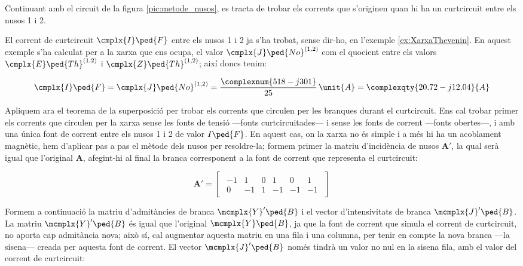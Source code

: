 \begin{exemple}\label{ex:CurtcircuitXarxaComplexa}
	\addcontentsxms{\CurtcircuitXarxaComplexa}	
	Continuant amb el circuit de la figura \vref{pic:metode_nusos}, es
	tracta de trobar els corrents que s'originen quan hi ha un curtcircuit entre els nusos 1 i 2.
	
	El corrent de curtcircuit $\cmplx{I}\ped{F}$ entre els nusos 1 i 2 ja s'ha trobat, sense dir-ho, en l'exemple \ref{ex:XarxaThevenin}. En aquest exemple s'ha calculat per a la xarxa que ens ocupa, el valor $\cmplx{J}\ped{No}^{(1,2)}$ com el quocient entre els valors $\cmplx{E}\ped{Th}^{(1,2)}$ i $\cmplx{Z}\ped{Th}^{(1,2)}$;  així doncs tenim:
	
	\[
		\cmplx{I}\ped{F} = \cmplx{J}\ped{No}^{(1,2)} =  \frac{\complexnum{518-j301}}{25}\,\unit{A} = \complexqty{20.72-j12.04}{A}
	\]
	
	Apliquem ara el teorema de la superposició per trobar els corrents que circulen per les branques durant el curtcircuit. Ens cal trobar primer els corrents que circulen per la xarxa sense les fonts de tensió ---fonts curtcircuitades--- i sense les fonts de corrent ---fonts  obertes---, i amb una única font de corrent entre els nusos 1 i 2 de valor  $I\ped{F}$. En aquest cas, on la xarxa no és simple i a més hi ha un acoblament magnètic, hem d'aplicar pas a pas el mètode dels nusos per resoldre-la; formem primer la matriu d'incidència  de nusos $\boldsymbol{A}'$, la qual serà igual que l'original $\boldsymbol{A}$, afegint-hi al final la branca corresponent a la font de corrent que representa el curtcircuit:

	\[
		\boldsymbol{A}' = 
		\begin{bmatrix}\begin{array}{rrrrrr} 
				-1 & 1  & 0 &  1 & 0 & 1\\  0 & -1 & 1 & -1 & -1 & -1
		\end{array}\end{bmatrix}
	\]	
	
	Formem a continuació la matriu d'admitàncies de branca $\mcmplx{Y}'\ped{B}$ i el vector d'intensivitats de branca $\mcmplx{J}'\ped{B}$. La matriu $\mcmplx{Y}'\ped{B}$ és igual que l'original $\mcmplx{Y}\ped{B}$, ja que la font de corrent que simula el corrent de curtcircuit, no aporta cap admitància nova; això sí, cal augmentar aquesta matriu en una fila i una columna, per tenir en compte la nova branca ---la sisena--- creada per aquesta font de corrent. El vector $\mcmplx{J}'\ped{B}$ només tindrà un valor no nul en la sisena fila, amb el valor del corrent de curtcircuit:
	

\end{exemple}
